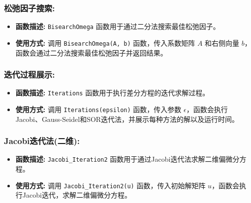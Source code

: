 \documentclass{article}
\begin{document}
\subsubsection*{松弛因子搜索:}
\begin{itemize}
	\item \textbf{函数描述:} \texttt{BisearchOmega} 函数用于通过二分法搜索最佳松弛因子。
	\item \textbf{使用方式:} 调用 \texttt{BisearchOmega(A, b)} 函数，传入系数矩阵 $A$ 和右侧向量 $b$，函数会通过二分法搜索最佳松弛因子并返回结果。
\end{itemize}

\subsubsection*{迭代过程展示:}
\begin{itemize}
	\item \textbf{函数描述:} \texttt{Iterations} 函数用于执行差分方程的迭代求解过程。
	\item \textbf{使用方式:} 调用 \texttt{Iterations(epsilon)} 函数，传入参数 $\epsilon$，函数会执行Jacobi、Gauss-Seidel和SOR迭代法，并展示每种方法的解以及运行时间。
\end{itemize}


\subsubsection*{Jacobi迭代法(二维):}
\begin{itemize}
	\item \textbf{函数描述:} \texttt{Jacobi\_Iteration2} 函数用于通过Jacobi迭代法求解二维偏微分方程。
	\item \textbf{使用方式:} 调用 \texttt{Jacobi\_Iteration2(u)} 函数，传入初始解矩阵 $u$，函数会执行Jacobi迭代，求解二维偏微分方程。
\end{itemize}
\end{document}
